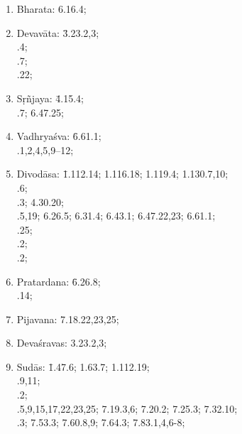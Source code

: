\begin{enumerate}
\itemsep=0pt
\item Bharata: 6.16.4;
\item \begin{tabbing}
Devavāta: \= 3.23.2,3;\\ 
.4;\\ 
.7;\\ 
.22;
\end{tabbing}

\item \begin{tabbing}
Sṛñjaya: \= 4.15.4;\\ 
.7; 6.47.25;
\end{tabbing}

\item 
\begin{tabbing}
Vadhryaśva:  \= 6.61.1;\\ 
.1,2,4,5,9--12;
\end{tabbing}

\item 
\begin{tabbing}
Divodāsa: \= 1.112.14; 1.116.18; 1.119.4; 1.130.7,10;\\ 
.6;\\ 
.3; 4.30.20;\\ 
.5,19; 6.26.5; 6.31.4; 6.43.1; 6.47.22,23; 6.61.1;\\
.25;\\
.2;\\
.2;
\end{tabbing}

\item 
\begin{tabbing}
Pratardana: \= 6.26.8;\\ 
.14;
\end{tabbing}

\item Pijavana: 7.18.22,23,25;

\item Devaśravas: 3.23.2,3;

\item 
\begin{tabbing}
Sudās: \= 1.47.6; 1.63.7; 1.112.19;\\
.9,11;\\
.2;\\
.5,9,15,17,22,23,25; 7.19.3,6; 7.20.2; 7.25.3; 7.32.10;\\ 
.3; 7.53.3; 7.60.8,9; 7.64.3; 7.83.1,4,6-8; 
\end{tabbing}


\end{enumerate}
